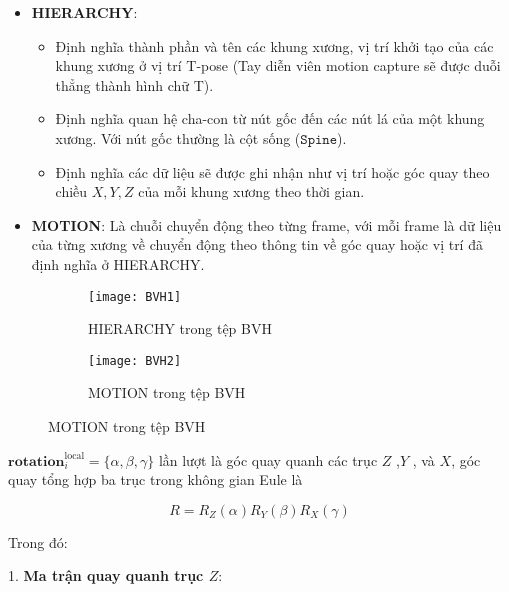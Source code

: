 \begin{itemize}
	\item \textbf{HIERARCHY}:
	
	\begin{itemize}
		\item Định nghĩa thành phần và tên các khung xương, vị trí khởi tạo của các khung xương ở vị trí T-pose (Tay diễn viên motion capture sẽ được duỗi thẳng thành hình chữ T).
		\item Định nghĩa quan hệ cha-con từ nút gốc đến các nút lá của một khung xương. Với nút gốc thường là cột sống ($\texttt{Spine}$).
		\item Định nghĩa các dữ liệu sẽ được ghi nhận như vị trí hoặc góc quay theo chiều $X, Y, Z$ của mỗi khung xương theo thời gian.
	\end{itemize}
	
	\item \textbf{MOTION}: Là chuỗi chuyển động theo từng frame, với mỗi frame là dữ liệu của từng xương về chuyển động theo thông tin về góc quay hoặc vị trí đã định nghĩa ở HIERARCHY.
\end{itemize}

\begin{figure}[htbp]
	\centering
	\begin{subfigure}{0.49\textwidth}
		\centering
		\texttt{[image: BVH1]}
		\caption{HIERARCHY trong tệp BVH}
		\label{fig:BVH1}
	\end{subfigure}
	\hfill
	\begin{subfigure}{0.49\textwidth}
		\centering
		\texttt{[image: BVH2]}
		\caption{MOTION trong tệp BVH}
		\label{fig:BVH2}
	\end{subfigure}
\end{figure}




	
$\mathbf{rotation}_i^{\operatorname{local}} = \{ \alpha ,\beta , \gamma \}$ lần lượt là góc quay quanh các trục $Z$ ,$Y$ , và $X$, góc quay tổng hợp ba trục trong không gian Eule là 

\begin{equation}
R = R_Z(\alpha) R_Y(\beta) R_X(\gamma)
\end{equation}

Trong đó:

1. \textbf{Ma trận quay quanh trục \(Z\)}:

